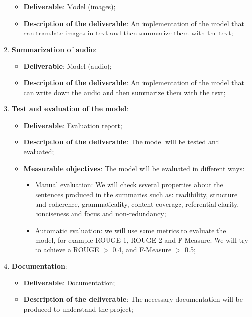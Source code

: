 \documentclass[12pt]{article}
\begin{document}
\begin{enumerate}
    \begin{itemize}
        \item \textbf{Deliverable}: Model (images);
        \item \textbf{Description of the deliverable}: An implementation of the model that can translate images in text and 
        then summarize them with the text;
    \end{itemize}
    \item \textbf{Summarization of audio}:
    \begin{itemize}
        \item \textbf{Deliverable}: Model (audio);
        \item \textbf{Description of the deliverable}: An implementation of the model that can write down the audio and  
        then summarize them with the text;
    \end{itemize}
    \item \textbf{Test and evaluation of the model}:
    \begin{itemize}
        \item \textbf{Deliverable}: Evaluation report;
        \item \textbf{Description of the deliverable}: The model will be tested and evaluated;
        \item \textbf{Measurable objectives}: The model will be evaluated in different ways:
        \begin{itemize}
            \item Manual evaluation: We will check several properties about the sentences produced in the summaries such as: readibility, structure and coherence, grammaticality, content coverage, referential clarity, conciseness and focus and non-redundancy;
            \item Automatic evaluation: we will use some metrics to evaluate the model, for example ROUGE-1, ROUGE-2 and F-Measure. We will try to achieve a ROUGE $>$ 0.4, and F-Measure $>$ 0.5;
        \end{itemize}
    \end{itemize}
    \item \textbf{Documentation}:
    \begin{itemize}
        \item \textbf{Deliverable}: Documentation;
        \item \textbf{Description of the deliverable}: The necessary documentation will be produced to understand the project;
    \end{itemize} 
\end{enumerate}
\end{document}
